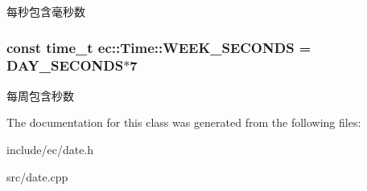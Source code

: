 每秒包含毫秒数 \hypertarget{classec_1_1Time_a785218cc22a7610f035cb6b36c84e62c}{
\subsubsection[{W\-E\-E\-K\-\_\-\-S\-E\-C\-O\-N\-D\-S}]{\setlength{\rightskip}{0pt plus 5cm}const time\-\_\-t ec\-::\-Time\-::\-W\-E\-E\-K\-\_\-\-S\-E\-C\-O\-N\-D\-S = {\bf D\-A\-Y\-\_\-\-S\-E\-C\-O\-N\-D\-S}$\ast$7\hspace{0.3cm}{\ttfamily [static]}}}\label{classec_1_1Time_a785218cc22a7610f035cb6b36c84e62c}
每周包含秒数 

The documentation for this class was generated from the following files\-:\begin{DoxyCompactItemize}
\item 
include/ec/date.\-h\item 
src/date.\-cpp\end{DoxyCompactItemize}
